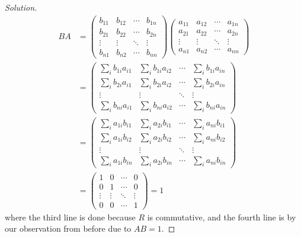\documentclass{article}
\begin{document}
\begin{proof}[Solution]
\begin{align*}
		BA &= \begin{pmatrix} b_{11} & b_{12} & \cdots & b_{1n}\\
			b_{21} & b_{22} & \cdots & b_{2n}\\
			\vdots & \vdots & \ddots & \vdots\\
		b_{n1} & b_{n2} & \cdots & b_{nn}\end{pmatrix}
		\begin{pmatrix} a_{11} & a_{12} & \cdots & a_{1n}\\
			a_{21} & a_{22} & \cdots & a_{2n}\\
			\vdots & \vdots & \ddots & \vdots\\
		a_{n1} & a_{n2} & \cdots & a_{nn}\end{pmatrix}\\
	   &= \begin{pmatrix} \sum_i b_{1i}a_{i1} & \sum_i b_{1i}a_{i2} & \cdots & \sum_i b_{1i}a_{in}\\
		   \sum_i b_{2i}a_{i1} & \sum_i b_{2i}a_{i2} & \cdots & \sum_i b_{2i}a_{in}\\
			\vdots & \vdots & \ddots & \vdots\\
			\sum_i b_{ni}a_{i1} & \sum_i b_{ni}a_{i2} & \cdots & \sum_i b_{ni}a_{in}
		\end{pmatrix}\\
		&= \begin{pmatrix} \sum_i a_{1i}b_{i1} & \sum_i a_{2i}b_{i1} & \cdots & \sum_i a_{ni}b_{i1}\\
		   \sum_i a_{1i}b_{i2} & \sum_i a_{2i}b_{i2} & \cdots & \sum_i a_{ni}b_{i2}\\
			\vdots & \vdots & \ddots & \vdots\\
			\sum_i a_{1i}b_{in} & \sum_i a_{2i}b_{in} & \cdots & \sum_i a_{ni}b_{in}
		\end{pmatrix}\\
		&= \begin{pmatrix} 1 & 0 & \cdots & 0\\ 0 & 1 & \cdots & 0\\
			\vdots & \vdots & \ddots & \vdots\\ 0 & 0 & \cdots & 1\end{pmatrix} = 1
	\end{align*}
	where the third line is done because $R$ is commutative,
	and the fourth line is by our observation from before due to $AB = 1$.
\end{proof}
\end{document}
